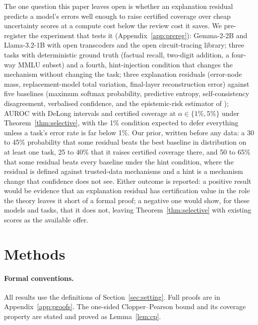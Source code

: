 \documentclass[11pt,letterpaper]{article}
\theoremstyle{plain}
\theoremstyle{definition}
\theoremstyle{remark}
\begin{document}
The one question this paper leaves open is whether an explanation residual predicts a model's errors well enough to raise certified coverage over cheap uncertainty scores at a compute cost below the review cost it saves. We pre-register the experiment that tests it (Appendix~\ref{app:prereg}): Gemma-2-2B and Llama-3.2-1B with open transcoders and the open circuit-tracing library; three tasks with deterministic ground truth (factual recall, two-digit addition, a four-way MMLU subset) and a fourth, hint-injection condition that changes the mechanism without changing the task; three explanation residuals (error-node mass, replacement-model total variation, final-layer reconstruction error) against five baselines (maximum softmax probability, predictive entropy, self-consistency disagreement, verbalised confidence, and the epistemic-risk estimator of \citet{melo2026}); AUROC with DeLong intervals and certified coverage at $\alpha\in\{1\%,5\%\}$ under Theorem~\ref{thm:selective}, with the 1\% condition expected to defer everything unless a task's error rate is far below 1\%. Our prior, written before any data: a 30 to 45\% probability that some residual beats the best baseline in distribution on at least one task, 25 to 40\% that it raises certified coverage there, and 50 to 65\% that some residual beats every baseline under the hint condition, where the residual is defined against trusted-data mechanisms and a hint is a mechanism change that confidence does not see. Either outcome is reported: a positive result would be evidence that an explanation residual has certification value in the role the theory leaves it short of a formal proof; a negative one would show, for these models and tasks, that it does not, leaving Theorem~\ref{thm:selective} with existing scores as the available offer.

\section*{Methods}

\paragraph{Formal conventions.} All results use the definitions of Section~\ref{sec:setting}. Full proofs are in Appendix~\ref{app:proofs}. The one-sided Clopper--Pearson bound and its coverage property are stated and proved as Lemma~\ref{lem:cp}.
\end{document}
